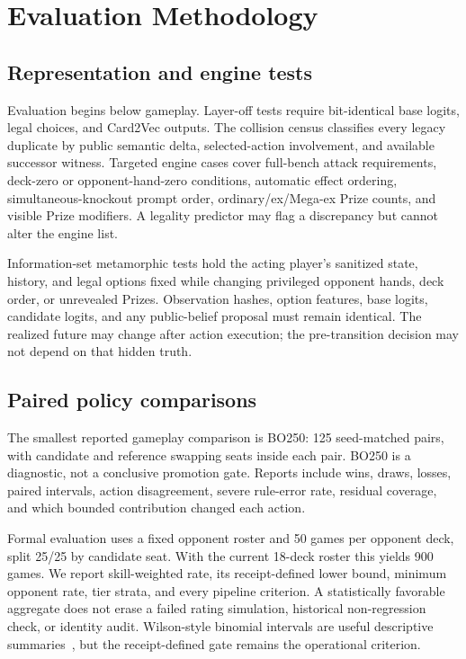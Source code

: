 \section{Evaluation Methodology}

\subsection{Representation and engine tests}

Evaluation begins below gameplay. Layer-off tests require bit-identical base
logits, legal choices, and Card2Vec outputs. The collision census classifies
every legacy duplicate by public semantic delta, selected-action involvement,
and available successor witness. Targeted engine cases cover full-bench attack
requirements, deck-zero or opponent-hand-zero conditions, automatic effect
ordering, simultaneous-knockout prompt order, ordinary/ex/Mega-ex Prize counts,
and visible Prize modifiers. A legality predictor may flag a discrepancy but
cannot alter the engine list.

Information-set metamorphic tests hold the acting player's sanitized state,
history, and legal options fixed while changing privileged opponent hands, deck
order, or unrevealed Prizes. Observation hashes, option features, base logits,
candidate logits, and any public-belief proposal must remain identical. The
realized future may change after action execution; the pre-transition decision
may not depend on that hidden truth.

\subsection{Paired policy comparisons}

The smallest reported gameplay comparison is BO250: 125 seed-matched pairs,
with candidate and reference swapping seats inside each pair. BO250 is a
diagnostic, not a conclusive promotion gate. Reports include wins, draws,
losses, paired intervals, action disagreement, severe rule-error rate, residual
coverage, and which bounded contribution changed each action.

Formal evaluation uses a fixed opponent roster and 50 games per opponent deck,
split 25/25 by candidate seat. With the current 18-deck roster this yields 900
games. We report skill-weighted rate, its receipt-defined lower bound, minimum
opponent rate, tier strata, and every pipeline criterion. A statistically
favorable aggregate does not erase a failed rating simulation, historical
non-regression check, or identity audit. Wilson-style binomial intervals are
useful descriptive summaries~\cite{wilson1927probable}, but the receipt-defined
gate remains the operational criterion.

